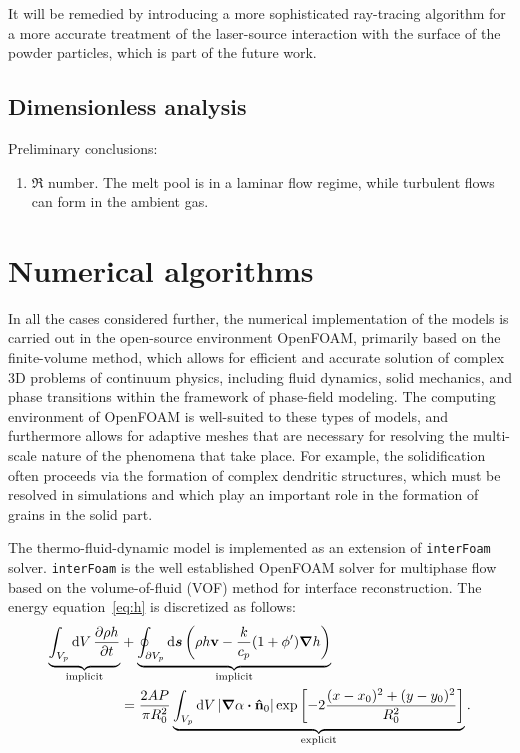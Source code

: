 \documentclass{article}
\newcommand{\OpenFOAM}{OpenFOAM\textregistered\xspace}
\newcommand{\bv}{\vb{v}}
\newcommand{\bn}{\vu{n}}
\newcommand{\intCell}{\int_{V_p} \dd{V}}
\newcommand{\intFaces}{\oint_{\partial V_p} \dd{\vb*{s}}}
\begin{document}
It will be remedied by introducing a more sophisticated ray-tracing algorithm
for a more accurate treatment of the laser-source interaction with the surface of the powder particles,
which is part of the future work.

\subsection{Dimensionless analysis}

Preliminary conclusions:
\begin{enumerate}
    \item $\Re$ number. The melt pool is in a laminar flow regime, while  turbulent flows can form in the ambient gas.
\end{enumerate}

\section{Numerical algorithms}

In all the cases considered further, the numerical implementation of the models is carried out
in the open-source environment \OpenFOAM, primarily based on the finite-volume method,
which allows for efficient and accurate solution of complex 3D problems of continuum physics,
including fluid dynamics, solid mechanics, and phase transitions within the framework of phase-field modeling.
The computing environment of \OpenFOAM is well-suited to these types of models,
and furthermore allows for adaptive meshes that are necessary
for resolving the multi-scale nature of the phenomena that take place.
For example, the solidification often proceeds via the formation of complex dendritic structures,
which must be resolved in simulations and which play an important role in the formation of grains in the solid part.

The thermo-fluid-dynamic model is implemented as an extension of \verb+interFoam+ solver.
\verb+interFoam+ is the well established \OpenFOAM solver for multiphase flow
based on the volume-of-fluid (VOF) method for interface reconstruction.
The energy equation~\eqref{eq:h} is discretized as follows:
\begin{equation}\label{eq:h_scheme}
    \begin{aligned}
    \underbrace{
        \intCell \pdv{\rho h}{t}
    }_\text{implicit} &+ \underbrace{
        \intFaces \qty(\rho h\bv - \frac{k}{c_p}(1+\phi')\grad{h})
    }_\text{implicit} \\ &= \frac{2AP}{\pi R_0^2}\underbrace{
        \intCell |\grad\alpha\vdot\bn_0|\exp\qty[-2\frac{(x-x_0)^2 + (y-y_0)^2}{R_0^2}]
    }_\text{explicit}.
    \end{aligned}
\end{equation}
\end{document}

